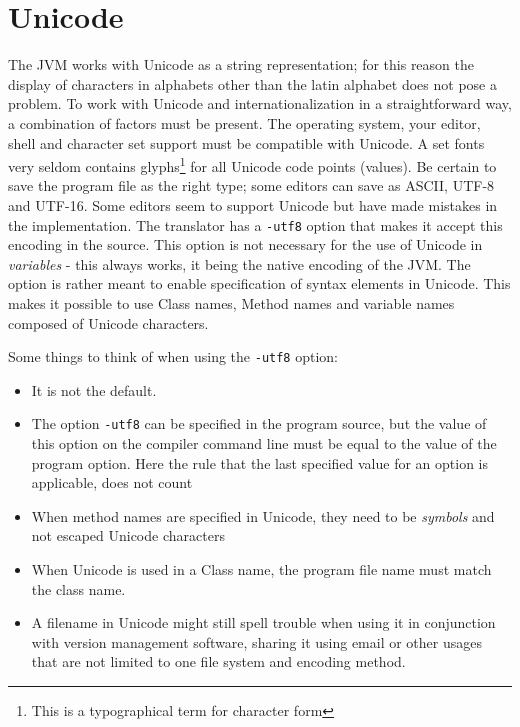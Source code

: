 \chapter{Unicode}
The JVM works with Unicode as a string representation; for this reason the display of characters in alphabets other than the latin alphabet does not pose a problem. To work with Unicode and internationalization in a straightforward way, a combination of factors must be present. The operating system, your editor, shell and character set support must be compatible with Unicode. A set fonts very seldom contains glyphs\footnote{This is a typographical term for character form} for all Unicode code points (values). Be certain to save the program file as the right type; some editors can save as ASCII, UTF-8 and UTF-16. Some editors seem to support Unicode but have made mistakes in the implementation. The \nr{} translator has a \texttt{-utf8} option that makes it accept this encoding in the source. This option is not necessary for the use of Unicode in \emph{variables} - this always works, it being the native encoding of the JVM. The option is rather meant to enable specification of \nr{} syntax elements in Unicode. This makes it possible to use Class names, Method names and variable names composed of Unicode characters.

Some things to think of when using the \texttt{-utf8} option:
\begin{itemize}
\item It is not the default.
\item The option \texttt{-utf8} can be specified in the program source, but the value of this option on the compiler command line must be equal to the value of the program option. Here the rule that the last specified value for an option is applicable, does not count
\item When method names are specified in Unicode, they need to be \emph{symbols} and not escaped Unicode characters
\item When Unicode is used in a Class name, the program file name must match the class name.
\item A filename in Unicode might still spell trouble when using it in conjunction with version management software, sharing it using email or other usages that are not limited to one file system and encoding method.
\end{itemize}

